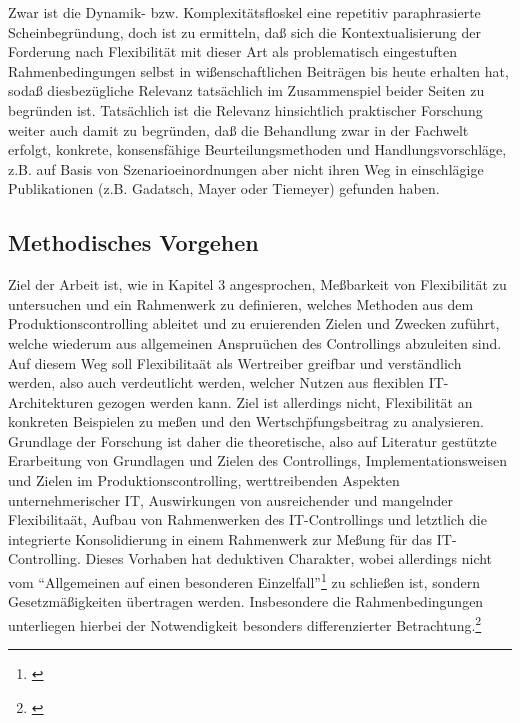 Zwar ist die Dynamik- bzw. Komplexit\"atsfloskel eine repetitiv paraphrasierte Scheinbegr\"undung, doch ist zu ermitteln, da{\ss} sich die Kontextualisierung der Forderung nach Flexibilit\"at mit dieser Art als problematisch eingestuften Rahmenbedingungen selbst in wi{\ss}enschaftlichen Beitr\"agen bis heute erhalten hat, soda{\ss} diesbez\"ugliche Relevanz tats\"achlich im Zusammenspiel beider Seiten zu begr\"unden ist. 
Tats\"achlich ist die Relevanz hinsichtlich praktischer Forschung weiter auch damit zu begr\"unden, da{\ss} die Behandlung zwar in der Fachwelt erfolgt, konkrete, konsensf\"ahige Beurteilungsmethoden und Handlungsvorschl\"age, z.B. auf Basis von Szenarioeinordnungen aber nicht ihren Weg in einschl\"agige Publikationen (z.B. Gadatsch, Mayer oder Tiemeyer) gefunden haben.


\subsection{Methodisches Vorgehen}
Ziel der Arbeit ist, wie in Kapitel 3 angesprochen, Me{\ss}barkeit von Flexibilit\"at zu untersuchen und ein Rahmenwerk zu definieren, welches Methoden aus dem Produktionscontrolling ableitet und zu eruierenden Zielen und Zwecken zuf\"uhrt, welche wiederum aus allgemeinen Anspru\"uchen des Controllings abzuleiten sind. Auf diesem Weg soll Flexibilita\"at als Wertreiber greifbar und verst\"andlich werden, also auch verdeutlicht werden, welcher Nutzen aus flexiblen IT-Architekturen gezogen werden kann.
Ziel ist allerdings nicht, Flexibilit\"at an konkreten Beispielen zu me{\ss}en und den Wertsch\"pfungsbeitrag zu analysieren.
Grundlage der Forschung ist daher die theoretische, also auf Literatur gest\"utzte Erarbeitung von Grundlagen und Zielen des Controllings, Implementationsweisen und Zielen im Produktionscontrolling, werttreibenden Aspekten unternehmerischer IT, Auswirkungen von ausreichender und mangelnder Flexibilita\"at, Aufbau von Rahmenwerken des IT-Controllings und letztlich die integrierte Konsolidierung in einem Rahmenwerk zur Me{\ss}ung f\"ur das IT-Controlling. 
Dieses Vorhaben hat deduktiven Charakter, wobei allerdings nicht vom ``Allgemeinen auf einen besonderen Einzelfall''\footnote{\cite[S.37]{Sandberg2017}} zu schlie{\ss}en ist, sondern Gesetzm\"a{\ss}igkeiten \"ubertragen werden. 
Insbesondere die Rahmenbedingungen unterliegen hierbei der Notwendigkeit besonders differenzierter Betrachtung.\footnote{\cite[S.37-39]{Sandberg2017}}












